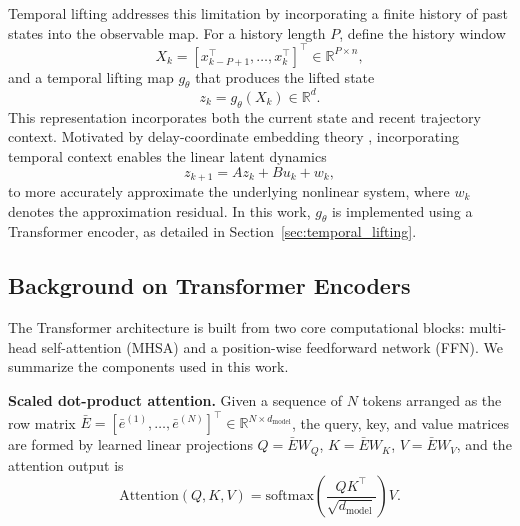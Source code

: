 \documentclass[journal]{IEEEtran}
\begin{document}
Temporal lifting addresses this limitation by incorporating a finite history of past states into the observable map. For a history length $P$, define the history window
\begin{equation}
    X_k = [x_{k-P+1}^\top, \ldots, x_k^\top]^\top \in \mathbb{R}^{P\times n},
    \label{eq:history_window}
\end{equation}
and a temporal lifting map $g_\theta$ that produces the lifted state
\begin{equation}
    z_k = g_\theta(X_k) \in \mathbb{R}^d.
    \label{eq:temporal_lifting}
\end{equation}
This representation incorporates both the current state and recent trajectory context. Motivated by delay-coordinate embedding theory \cite{arbabi2017ergodic, rank2019recurrent}, incorporating temporal context enables the linear latent dynamics
\begin{equation}
    z_{k+1} = A z_k + B u_k + w_k,
    \label{eq:lifted_dynamics_prelim}
\end{equation}
to more accurately approximate the underlying nonlinear system, where $w_k$ denotes the approximation residual. In this work, $g_\theta$ is implemented using a Transformer encoder, as detailed in Section~\ref{sec:temporal_lifting}.

\subsection{Background on Transformer Encoders}
\label{sec:transformer_background}

The Transformer architecture \cite{vaswani2017attention} is built from two core computational blocks: multi-head self-attention (MHSA) and a position-wise feedforward network (FFN). We summarize the components used in this work.

\textbf{Scaled dot-product attention.} Given a sequence of $N$ tokens arranged as the row matrix $\bar{E} = [\bar{e}^{(1)}, \ldots, \bar{e}^{(N)}]^\top \in \mathbb{R}^{N \times d_{\mathrm{model}}}$, the query, key, and value matrices are formed by learned linear projections $Q = \bar{E}W_Q$, $K = \bar{E}W_K$, $V = \bar{E}W_V$, and the attention output is
\begin{equation}
    \mathrm{Attention}(Q,K,V)
    = \mathrm{softmax}\!\left(\frac{QK^\top}{\sqrt{d_{\mathrm{model}}}}\right)V.
    \label{eq:attention}
\end{equation}
\end{document}
